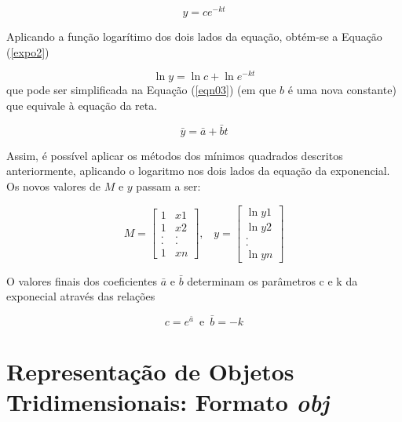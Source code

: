 {	\begin{equation}
	\label{expo}
		y = ce^{-kt}
	\end{equation}

	Aplicando a função logarítimo dos dois lados da equação, obtém-se a  Equação (\ref{expo2})

	\begin{equation}
	\label{expo2}
		\ln{y} = \ln{c}  + \ln{e^{-kt}}
	\end{equation}
 	que pode ser simplificada na  Equação (\ref{eqn03}) (em que $b$ é uma nova constante) que equivale à equação da reta. 

	\begin{equation}
	\label{eqn03}
		\bar{y} = \bar{a} + \bar{b}t
	\end{equation}	

	Assim, é possível aplicar os métodos dos mínimos quadrados descritos anteriormente, aplicando o logaritmo nos dois lados da equação da exponencial. Os novos valores de $M$ e $y$ passam a ser: 

	\begin{equation}
	M = \left[\begin{array}{cc}
               	1 &  x1 \\
               	1 & x2  \\
		. & .  \\
               	. & .  \\
		1 & xn
          	         \end{array}\right] \mbox{,} \quad
	y = \left[\begin{array}{c}
               	\ln{y1} \\
               	\ln{y2}  \\
		.   \\
               	.   \\
		\ln{yn}
          	         \end{array}\right] 
	\label{nvar}
	\end{equation}

	O valores finais dos coeficientes $\bar{a}$ e $\bar{b}$ determinam os parâmetros c e k da exponecial através das relações

	\begin{equation}
	c = e^{\bar{a}}\, \, \, \mbox{e}\, \, \,\bar{b} = -k
	\end{equation} 


\section{Representação de Objetos Tridimensionais: Formato \textit{obj}}
\label{formatobj}

}
